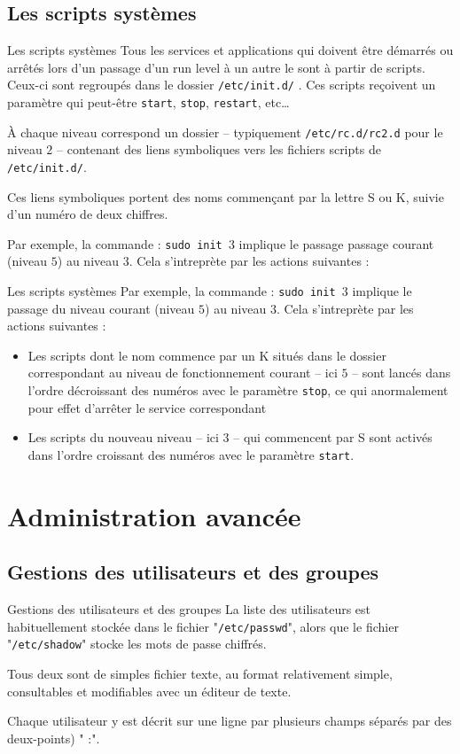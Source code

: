\documentclass[10pt]{beamer}
\begin{document}
\subsection{Les scripts systèmes}
\begin{frame}{Les scripts systèmes}
Tous les services et applications qui doivent être démarrés ou arrêtés lors d'un passage d'un run level à un autre le sont à partir de scripts. Ceux-ci sont regroupés dans le dossier \texttt{/etc/init.d/} . Ces scripts reçoivent un paramètre qui peut-être \texttt{start}, \texttt{stop}, \texttt{restart}, etc\ldots

À chaque niveau correspond un dossier – typiquement \texttt{/etc/rc.d/rc2.d} pour le
niveau $2$ – contenant des liens symboliques vers les fichiers scripts de \texttt{/etc/init.d/}.

Ces liens symboliques portent des noms commençant par la lettre \alert{S} ou \alert{K}, suivie
d'un numéro de deux chiffres.

Par exemple, la commande : \texttt{sudo \alert{init} $3$} implique le passage passage courant (niveau $5$) au niveau $3$. Cela s'intreprète par les actions suivantes :
\end{frame}

\begin{frame}{Les scripts systèmes}
Par exemple, la commande : \texttt{sudo \alert{init} $3$} implique le passage du niveau courant (niveau $5$) au niveau $3$. Cela s'intreprète par les actions suivantes :
\begin{itemize}
	\item Les scripts dont le nom commence par un \alert{K} situés dans le dossier correspondant au niveau de fonctionnement courant – ici $5$ – sont lancés dans l'ordre décroissant des numéros avec le paramètre \texttt{\alert{stop}}, ce qui anormalement pour effet d'arrêter le service correspondant
	\item Les scripts du nouveau niveau – ici $3$ – qui commencent par \alert{S} sont activés dans l'ordre croissant des numéros avec le paramètre \texttt{\alert{start}}.
\end{itemize}
\end{frame}

\section{Administration avancée}
\subsection{Gestions des utilisateurs et des groupes}
\begin{frame}{Gestions des utilisateurs et des groupes}
La liste des utilisateurs est habituellement stockée dans le fichier "\texttt{/etc/passwd}",
alors que le fichier "\texttt{/etc/shadow}" stocke les mots de passe chiffrés. 

Tous deux sont de simples fichier texte, au format relativement simple, consultables et modifiables avec un éditeur de texte.

 Chaque utilisateur y est décrit sur une ligne par plusieurs champs séparés par des deux-points) " :".
\end{frame}
\end{document}
